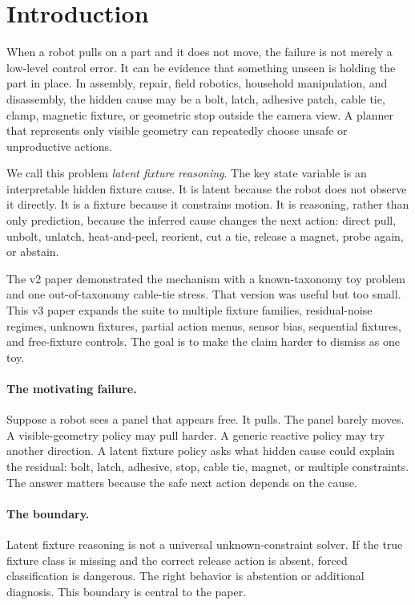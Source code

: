 \documentclass{article}
\begin{document}
\section{Introduction}

When a robot pulls on a part and it does not move, the failure is not merely a
low-level control error. It can be evidence that something unseen is holding
the part in place. In assembly, repair, field robotics, household
manipulation, and disassembly, the hidden cause may be a bolt, latch, adhesive
patch, cable tie, clamp, magnetic fixture, or geometric stop outside the
camera view. A planner that represents only visible geometry can repeatedly
choose unsafe or unproductive actions.

We call this problem \emph{latent fixture reasoning}. The key state variable is
an interpretable hidden fixture cause. It is latent because the robot does not
observe it directly. It is a fixture because it constrains motion. It is
reasoning, rather than only prediction, because the inferred cause changes the
next action: direct pull, unbolt, unlatch, heat-and-peel, reorient, cut a tie,
release a magnet, probe again, or abstain.

The v2 paper demonstrated the mechanism with a known-taxonomy toy problem and
one out-of-taxonomy cable-tie stress. That version was useful but too small.
This v3 paper expands the suite to multiple fixture families, residual-noise
regimes, unknown fixtures, partial action menus, sensor bias, sequential
fixtures, and free-fixture controls. The goal is to make the claim harder to
dismiss as one toy.

\paragraph{The motivating failure.}
Suppose a robot sees a panel that appears free. It pulls. The panel barely
moves. A visible-geometry policy may pull harder. A generic reactive policy may
try another direction. A latent fixture policy asks what hidden cause could
explain the residual: bolt, latch, adhesive, stop, cable tie, magnet, or
multiple constraints. The answer matters because the safe next action depends
on the cause.

\paragraph{The boundary.}
Latent fixture reasoning is not a universal unknown-constraint solver. If the
true fixture class is missing and the correct release action is absent, forced
classification is dangerous. The right behavior is abstention or additional
diagnosis. This boundary is central to the paper.
\end{document}
